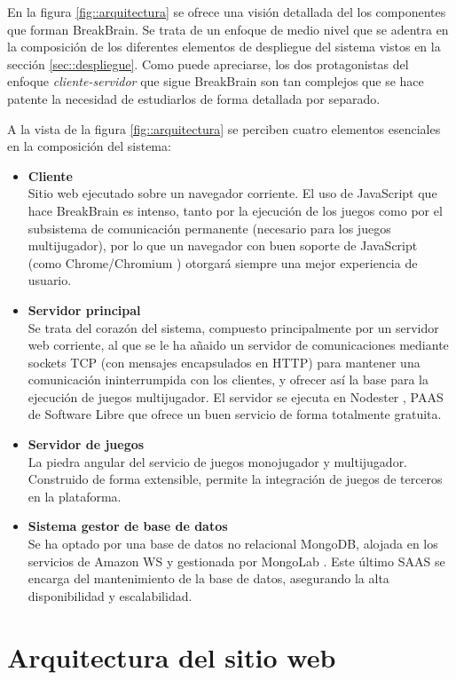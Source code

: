 En la figura \ref{fig::arquitectura} se ofrece una visión detallada del los componentes que forman BreakBrain. Se trata de un enfoque de medio nivel que se adentra en la composición de los diferentes elementos de despliegue del sistema vistos en la sección \ref{sec::despliegue}. Como puede apreciarse, los dos protagonistas del enfoque {\it cliente-servidor} que sigue BreakBrain son tan complejos que se hace patente la necesidad de estudiarlos de forma detallada por separado.

A la vista de la figura \ref{fig::arquitectura} se perciben cuatro elementos esenciales en la composición del sistema:

\begin{itemize}
\item {\bf Cliente}\\Sitio web ejecutado sobre un navegador corriente. El uso de JavaScript que hace BreakBrain es intenso, tanto por la ejecución de los juegos como por el subsistema de comunicación permanente (necesario para los juegos multijugador), por lo que un navegador con buen soporte de JavaScript (como Chrome/Chromium \cite{chrome}) otorgará siempre una mejor experiencia de usuario.
\item {\bf Servidor principal}\\Se trata del corazón del sistema, compuesto principalmente por un servidor web corriente, al que se le ha añaido un servidor de comunicaciones mediante sockets TCP (con mensajes encapsulados en HTTP) para mantener una comunicación ininterrumpida con los clientes, y ofrecer así la base para la ejecución de juegos multijugador. El servidor se ejecuta en Nodester \cite{Nodester}, \acf{PAAS} de Software Libre que ofrece un buen servicio de forma totalmente gratuita.
\item {\bf Servidor de juegos}\\La piedra angular del servicio de juegos monojugador y multijugador. Construido de forma extensible, permite la integración de juegos de terceros en la plataforma. 
\item {\bf Sistema gestor de base de datos}\\Se ha optado por una base de datos no relacional MongoDB, alojada en los servicios de Amazon WS \cite{Amazon} y gestionada por MongoLab \cite{Mongolab}. Este último \acf{SAAS} se encarga del mantenimiento de la base de datos, asegurando la alta disponibilidad y escalabilidad.
\end{itemize}

\section{Arquitectura del sitio web}

